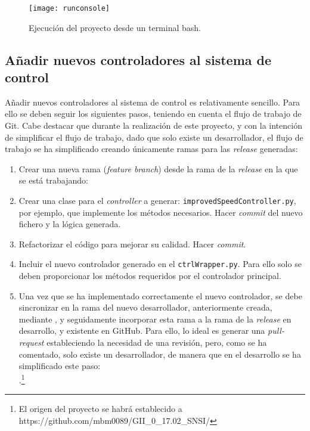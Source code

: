 \begin{figure}
	\centering
	\texttt{[image: runconsole]}
	\caption[Ejecución del proyecto desde terminal]{Ejecución del proyecto desde un terminal bash.}\label{fig:runconsole}
\end{figure}

\subsection{Añadir nuevos controladores al sistema de control}

Añadir nuevos controladores al sistema de control es relativamente sencillo. Para ello se deben seguir los siguientes pasos, teniendo en cuenta el flujo de trabajo de Git. Cabe destacar que durante la realización de este proyecto, y con la intención de simplificar el flujo de trabajo, dado que solo existe un desarrollador, el flujo de trabajo se ha simplificado creando únicamente ramas para las \emph{release} generadas: 
\begin{enumerate}
\item Crear una nueva rama (\emph{feature branch}) desde la rama de la \emph{release} en la que se está trabajando:\\ 
  
\item Crear una clase para el \emph{controller} a generar: \texttt{improvedSpeedController.py}, por ejemplo, que implemente los métodos necesarios. Hacer \emph{commit} del nuevo fichero y la lógica generada.
\item Refactorizar el código para mejorar su calidad. Hacer \emph{commit}.
\item Incluir el nuevo controlador generado en el \texttt{ctrlWrapper.py}. Para ello solo se deben proporcionar los métodos requeridos por el controlador principal. 
\item Una vez que se ha implementado correctamente el nuevo controlador, se debe sincronizar en la rama del nuevo desarrollador, anteriormente creada, mediante , y seguidamente incorporar esta rama a la rama de la \emph{release} en desarrollo, y existente en GitHub. Para ello, lo ideal es generar una \emph{pull-request} estableciendo la necesidad de una revisión, pero, como se ha comentado, solo existe un desarrollador, de manera que en el desarrollo se ha simplificado este paso:\\ .\footnote{El origen del proyecto se habrá establecido a https://github.com/mbm0089/GII\_0\_17.02\_SNSI/}
\end{enumerate}

